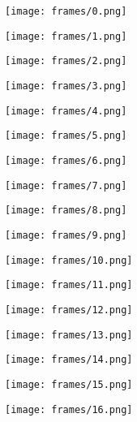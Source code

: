 \begin{center}
     \texttt{[image: frames/0.png]}
\end{center}
\begin{center}
     \texttt{[image: frames/1.png]}
\end{center}
\begin{center}
     \texttt{[image: frames/2.png]}
\end{center}
\begin{center}
     \texttt{[image: frames/3.png]}
\end{center}
\begin{center}
     \texttt{[image: frames/4.png]}
\end{center}
\begin{center}
     \texttt{[image: frames/5.png]}
\end{center}
\begin{center}
     \texttt{[image: frames/6.png]}
\end{center}
\begin{center}
     \texttt{[image: frames/7.png]}
\end{center}
\begin{center}
     \texttt{[image: frames/8.png]}
\end{center}
\begin{center}
     \texttt{[image: frames/9.png]}
\end{center}
\begin{center}
     \texttt{[image: frames/10.png]}
\end{center}
\begin{center}
     \texttt{[image: frames/11.png]}
\end{center}
\begin{center}
     \texttt{[image: frames/12.png]}
\end{center}
\begin{center}
     \texttt{[image: frames/13.png]}
\end{center}
\begin{center}
     \texttt{[image: frames/14.png]}
\end{center}
\begin{center}
     \texttt{[image: frames/15.png]}
\end{center}
\begin{center}
     \texttt{[image: frames/16.png]}
\end{center}
